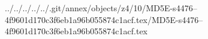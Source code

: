 ../../../../../.git/annex/objects/z4/10/MD5E-s4476--4f9601d170c3f6eb1a96b055874c1acf.tex/MD5E-s4476--4f9601d170c3f6eb1a96b055874c1acf.tex